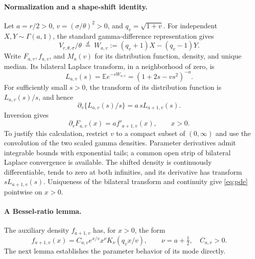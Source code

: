 \documentclass[11pt]{article}
\newcommand{\E}{\mathbb E}
\begin{document}
\paragraph{Normalization and a shape-shift identity.}
Let \(a=r/2>0\), \(v=(\sigma/\theta)^2>0\), and \(q_v=\sqrt{1+v}\).
For independent \(X,Y\sim\Gamma(a,1)\), the standard gamma-difference
representation \cite[eq.\ (3.43)]{GM} gives
\begin{equation}\label{eq:representation}
 V_{r,\theta,\sigma}/\theta\ \stackrel d=\ 
 W_{a,v}:=(q_v+1)X-(q_v-1)Y.
\end{equation}
Write \(F_{a,v},f_{a,v}\), and \(M_a(v)\) for its distribution function,
density, and unique median.
Its bilateral Laplace transform, in a neighborhood of zero, is
\[
 L_{a,v}(s)=\E e^{-sW_{a,v}}=(1+2s-vs^2)^{-a}.
\]
For sufficiently small \(s>0\), the transform of its distribution
function is \(L_{a,v}(s)/s\), and hence
\[
 \partial_v\{L_{a,v}(s)/s\}=a\,sL_{a+1,v}(s).
\]
Inversion gives
\begin{equation}\label{eq:pde}
 \partial_vF_{a,v}(x)=a f'_{a+1,v}(x),\qquad x>0.
\end{equation}
To justify this calculation, restrict \(v\) to a compact subset of
\((0,\infty)\) and use the convolution of the two scaled gamma densities.
Parameter derivatives admit integrable bounds with exponential tails;
a common open strip of bilateral Laplace convergence is available.
The shifted density is continuously differentiable, tends to zero at
both infinities, and its derivative has transform \(sL_{a+1,v}(s)\).
Uniqueness of the bilateral transform and continuity give
\eqref{eq:pde} pointwise on \(x>0\).

\paragraph{A Bessel-ratio lemma.}
The auxiliary density \(f_{a+1,v}\) has, for \(x>0\), the form
\[
 f_{a+1,v}(x)=C_{a,v}e^{x/v}x^\nu K_\nu(q_vx/v),
 \qquad \nu=a+\tfrac12,\quad C_{a,v}>0.
\]
The next lemma establishes the parameter behavior of its mode directly.
\end{document}

